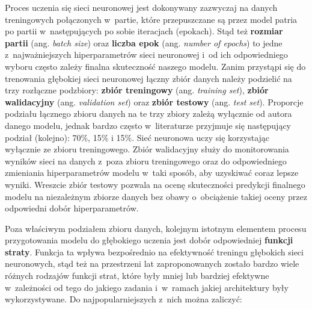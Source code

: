 Proces uczenia się sieci neuronowej jest dokonywany zazwyczaj na danych treningowych połączonych w~partie, które przepuszczane są przez model patria po partii w~następujących po sobie iteracjach (epokach). Stąd też \textbf{rozmiar partii} (ang. \emph{batch size}) oraz \textbf{liczba epok} (ang. \emph{number of epochs}) to jedne z~najważniejszych hiperparametrów sieci neuronowej i~od ich odpowiedniego wyboru często zależy finalna skuteczność naszego modelu. Zanim przystąpi się do trenowania głębokiej sieci neuronowej łączny zbiór danych należy podzielić na trzy rozłączne podzbiory: \textbf{zbiór treningowy} (ang. \emph{training set}), \textbf{zbiór walidacyjny} (ang. \emph{validation set}) oraz \textbf{zbiór testowy} (ang. \emph{test set}). Proporcje podziału łącznego zbioru danych na te trzy zbiory zależą wyłącznie od autora danego modelu, jednak bardzo często w~literaturze przyjmuje się następujący podział (kolejno): 70\%, 15\% i 15\%. Sieć neuronowa uczy się korzystając wyłącznie ze zbioru treningowego. Zbiór walidacyjny służy do monitorowania wyników sieci na danych z~poza zbioru treningowego oraz do odpowiedniego zmieniania hiperparametrów modelu w~taki sposób, aby uzyskiwać coraz lepsze wyniki. Wreszcie zbiór testowy pozwala na ocenę skuteczności predykcji finalnego modelu na niezależnym zbiorze danych bez obawy o~obciążenie takiej oceny przez odpowiedni dobór hiperparametrów. 

Poza właściwym podziałem zbioru danych, kolejnym istotnym elementem procesu przygotowania modelu do głębokiego uczenia jest dobór odpowiedniej \textbf{funkcji straty}. Funkcja ta wpływa bezpośrednio na efektywność treningu głębokich sieci neuronowych, stąd też na przestrzeni lat zaproponowanych zostało bardzo wiele różnych rodzajów funkcji strat, które były mniej lub bardziej efektywne w~zależności od tego do jakiego zadania i~w~ramach jakiej architektury były wykorzystywane. Do najpopularniejszych z~nich można zaliczyć:

